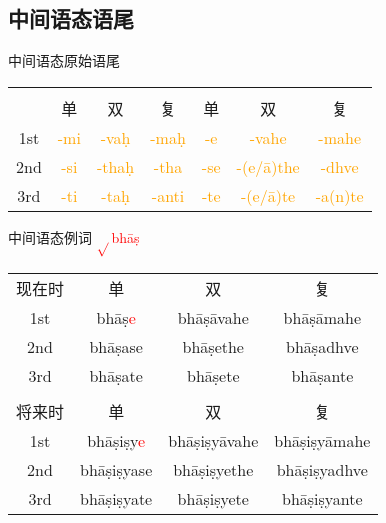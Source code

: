 \documentclass[17pt]{beamer}
\newcommand{\verbroot}[1]{\textcolor{red}{$\sqrt{}$#1}}
\newcommand{\wordending}[1]{\textcolor{Orange}{\nobreakdash-#1}}
\newcommand{\fullpada}[1]{\textcolor{OliveGreen}{#1}}
\newcommand{\veryimportant}[1]{\textcolor{red}{#1}}
\begin{document}
\subsection{中间语态语尾}
\begin{frame}{中间语态原始语尾}
  \small
  \centering
  \begin{NiceTabular}{@{}ccccccc@{}} %
    &  & & &  \\
    & 单 & 双 & 复 & 单 & 双 & 复 \\
    1st & \wordending{mi} & \wordending{vaḥ}  & \wordending{maḥ} & \wordending{e} & \wordending{vahe}  & \wordending{mahe}  \\
    2nd & \wordending{si} & \wordending{thaḥ} & \wordending{tha} & \wordending{se} & \wordending{(e/ā)the} & \wordending{dhve}   \\
    3rd & \wordending{ti} & \wordending{taḥ} & \wordending{anti} & \wordending{te} & \wordending{(e/ā)te} & \wordending{a(n)te}  \\
  \end{NiceTabular}
\end{frame}

\begin{frame}{中间语态例词 \verbroot{bhāṣ}}
  \small
  \centering
  \begin{tabular}{@{}cccc@{}} %
    现在时 & 单 & 双 & 复  \\
    1st & \fullpada{bhāṣ\veryimportant{e}} & \fullpada{bhāṣāvahe}  & \fullpada{bhāṣāmahe}  \\
    2nd & \fullpada{bhāṣase} & \fullpada{bhāṣethe} & \fullpada{bhāṣadhve}   \\
    3rd & \fullpada{bhāṣate} & \fullpada{bhāṣete} & \fullpada{bhāṣante}  \\
    \\
    将来时 & 单 & 双 & 复  \\
    1st & \fullpada{bhāṣiṣy\veryimportant{e}} & \fullpada{bhāṣiṣyāvahe}  & \fullpada{bhāṣiṣyāmahe}  \\
    2nd & \fullpada{bhāṣiṣyase} & \fullpada{bhāṣiṣyethe} & \fullpada{bhāṣiṣyadhve}   \\
    3rd & \fullpada{bhāṣiṣyate} & \fullpada{bhāṣiṣyete} & \fullpada{bhāṣiṣyante}  \\
  \end{tabular}
\end{frame}
\end{document}

